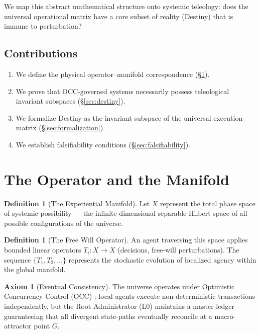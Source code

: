 \documentclass[12pt, a4paper]{article}
\theoremstyle{plain}
\theoremstyle{definition}
\newtheorem{definition}[theorem]{Definition}
\newtheorem{axiom}[theorem]{Axiom}
\theoremstyle{remark}
\begin{document}
We map this abstract mathematical structure onto systemic teleology: does the universal operational matrix have a core subset of reality (Destiny) that is immune to perturbation?

\subsection{Contributions}
\begin{enumerate}
    \item We define the physical operator--manifold correspondence (\S\ref{sec:operator}).
    \item We prove that OCC-governed systems necessarily possess teleological invariant subspaces (\S\ref{sec:destiny}).
    \item We formalize Destiny as the invariant subspace of the universal execution matrix (\S\ref{sec:formalization}).
    \item We establish falsifiability conditions (\S\ref{sec:falsifiability}).
\end{enumerate}

\section{The Operator and the Manifold}\label{sec:operator}

\begin{definition}[The Experiential Manifold]
Let $X$ represent the total phase space of systemic possibility --- the infinite-dimensional separable Hilbert space of all possible configurations of the universe.
\end{definition}

\begin{definition}[The Free Will Operator]
An agent traversing this space applies bounded linear operators $T_i: X \to X$ (decisions, free-will perturbations). The sequence $\{T_1, T_2, \ldots\}$ represents the stochastic evolution of localized agency within the global manifold.
\end{definition}

\begin{axiom}[Eventual Consistency]
The universe operates under Optimistic Concurrency Control (OCC) \citep{Kung1981}: local agents execute non-deterministic transactions independently, but the Root Administrator (L0) maintains a master ledger guaranteeing that all divergent state-paths eventually reconcile at a macro-attractor point $G$.
\end{axiom}
\end{document}
